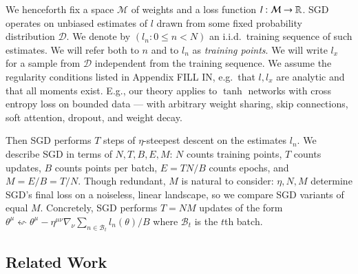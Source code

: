\documentclass{article}
\theoremstyle{plain}
\theoremstyle{definition}
\newcommand{\Bb}{\mathcal{B}}
\newcommand{\Dd}{\mathcal{D}}
\newcommand{\Mm}{\mathcal{M}}
\begin{document}
        We henceforth fix a space $\Mm$ of weights and a loss function
        $l:\Mm\to\RR$.  SGD operates on unbiased estimates of $l$
        drawn from some fixed probability distribution $\Dd$.  We denote
        by $(l_n: 0\leq n<N)$ an i.i.d.\ training sequence of such estimates.
        We will refer both to $n$ and to $l_n$ as \emph{training points}.  We
        will write $l_x$ for a sample from $\Dd$ independent from the
        training sequence.  We assume the regularity conditions listed in
        Appendix {\color{red} FILL IN}, e.g.\ that $l, l_x$ are analytic and
        that all moments exist.
        E.g.,
        our theory applies to $\tanh$ networks with cross entropy
        loss on bounded data --- with arbitrary weight sharing, skip
        connections, soft attention, dropout, and weight decay.
        

        Then SGD performs $T$ steps of $\eta$-steepest descent on the estimates
        $l_n$.
        We describe SGD in terms of $N,T,B,E,M$:
            $N$ counts training points,
            $T$ counts updates,
            $B$ counts points per batch,
            $E=TN/B$ counts epochs, 
            and $M=E/B=T/N$.
        Though redundant, $M$ is natural to consider: $\eta,N,M$ determine
        SGD's final loss on a noiseless, linear landscape, so we compare SGD
        variants of equal $M$.
        Concretely, SGD performs $T=NM$ updates of the form 
        $
            \theta^\mu
            \leftsquigarrow
            \theta^\mu -
            \eta^{\mu\nu} \nabla_\nu
                \sum_{n\in \Bb_t} l_n(\theta) / B
        $
        where $\Bb_t$ is the $t$th batch.


\subsection{Related Work} \label{sect:related}
\end{document}
